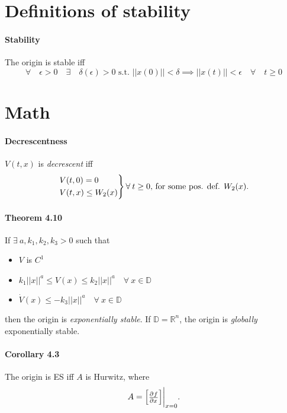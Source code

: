 
\section{Definitions of stability}
\paragraph{Stability} The origin is stable iff
\begin{equation}
	\forall \quad \epsilon > 0 \quad \exists \quad \delta(\epsilon) > 0
	\mbox{ s.t. }
	||x(0)|| < \delta \implies ||x(t)|| < \epsilon \quad \forall \quad t \geq 0
\end{equation}

\section{Math}

\paragraph{Decrescentness}
$V(t,x)$ is \emph{decrescent} iff
\begin{equation}
	\begin{rcases}
		V(t,0) =    0      \\
		V(t,x) \leq W_2(x)
	\end{rcases}
	\forall \: t \geq 0
	\mbox{, for some pos. def. }
	W_2(x).
\end{equation}

\paragraph{Theorem 4.10}
If $\exists \: a, k_1, k_2, k_3 > 0$ such that
\begin{itemize}
	\item $V$ is $C^1$
	\item $k_1 ||x||^a \leq V(x) \leq k_2 ||x||^a \quad \forall \: x \in \mathbb{D}$
	\item $\dot{V}(x) \leq - k_3 ||x||^a \quad \forall \: x \in \mathbb{D}$
\end{itemize}
then the origin is \emph{exponentially stable}. If $\mathbb{D} = \mathbb{R}^n$, the origin is \emph{globally} exponentially stable.

\paragraph{Corollary 4.3}
The origin is ES iff $A$ is Hurwitz, where
\begin{equation}
	A =
	\begin{bmatrix}
		\pd{f}{x}
	\end{bmatrix}
	\evalat{x=0}
	.
\end{equation}

